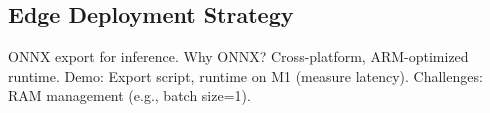 \subsection{Edge Deployment Strategy}
\label{sec:edgedeploy}

ONNX export for inference. Why ONNX? Cross-platform, ARM-optimized runtime. Demo: Export script, runtime on M1 (measure latency). Challenges: RAM management (e.g., batch size=1).